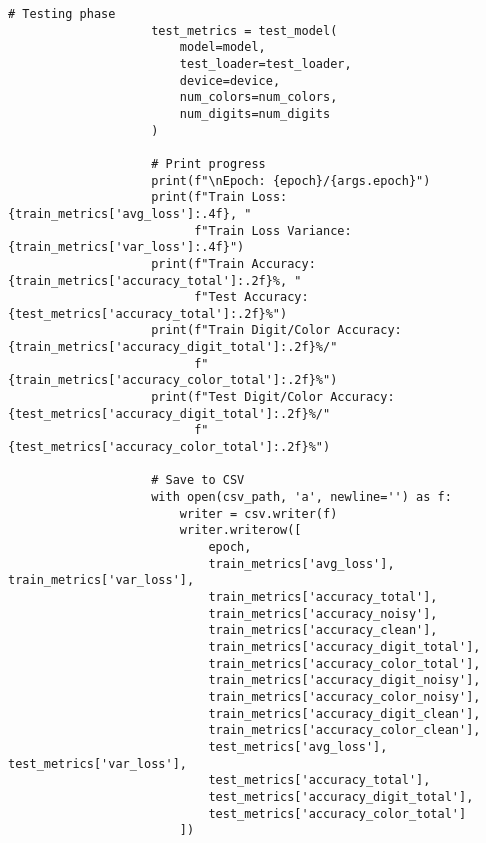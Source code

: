 \begin{lstlisting}[style=pythonstyle, caption={Program Example}]
                    # Testing phase
                    test_metrics = test_model(
                        model=model,
                        test_loader=test_loader,
                        device=device,
                        num_colors=num_colors,
                        num_digits=num_digits
                    )
    
                    # Print progress
                    print(f"\nEpoch: {epoch}/{args.epoch}")
                    print(f"Train Loss: {train_metrics['avg_loss']:.4f}, "
                          f"Train Loss Variance: {train_metrics['var_loss']:.4f}")
                    print(f"Train Accuracy: {train_metrics['accuracy_total']:.2f}%, "
                          f"Test Accuracy: {test_metrics['accuracy_total']:.2f}%")
                    print(f"Train Digit/Color Accuracy: {train_metrics['accuracy_digit_total']:.2f}%/"
                          f"{train_metrics['accuracy_color_total']:.2f}%")
                    print(f"Test Digit/Color Accuracy: {test_metrics['accuracy_digit_total']:.2f}%/"
                          f"{test_metrics['accuracy_color_total']:.2f}%")
    
                    # Save to CSV
                    with open(csv_path, 'a', newline='') as f:
                        writer = csv.writer(f)
                        writer.writerow([
                            epoch,
                            train_metrics['avg_loss'], train_metrics['var_loss'],
                            train_metrics['accuracy_total'],
                            train_metrics['accuracy_noisy'],
                            train_metrics['accuracy_clean'],
                            train_metrics['accuracy_digit_total'],
                            train_metrics['accuracy_color_total'],
                            train_metrics['accuracy_digit_noisy'],
                            train_metrics['accuracy_color_noisy'],
                            train_metrics['accuracy_digit_clean'],
                            train_metrics['accuracy_color_clean'],
                            test_metrics['avg_loss'], test_metrics['var_loss'],
                            test_metrics['accuracy_total'],
                            test_metrics['accuracy_digit_total'],
                            test_metrics['accuracy_color_total']
                        ])
    

\end{lstlisting}
